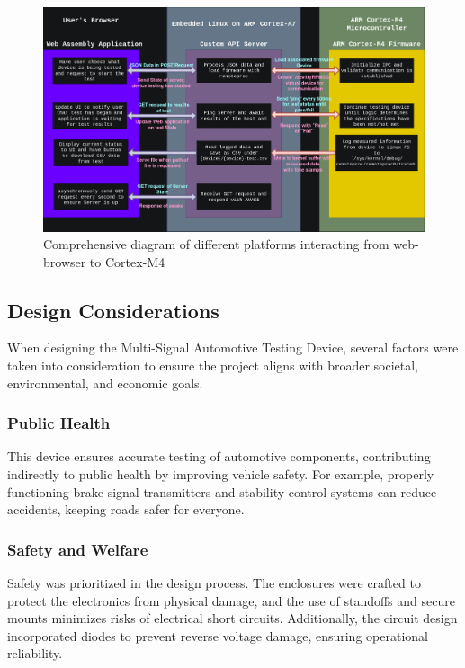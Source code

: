 \documentclass[12pt]{article}
\begin{document}
\begin{figure}[H]
  \includegraphics[width=\textwidth]{../assets/software_stack.drawio.png}
  \caption{Comprehensive diagram of different platforms interacting from web-browser to Cortex-M4}
\end{figure}

\subsection{Design Considerations}
When designing the Multi-Signal Automotive Testing Device, several factors were
taken into consideration to ensure the project aligns with broader societal,
environmental, and economic goals.

\subsubsection{Public Health}
This device ensures accurate testing of automotive components, contributing
indirectly to public health by improving vehicle safety. For example, properly
functioning brake signal transmitters and stability control systems can reduce
accidents, keeping roads safer for everyone.


\subsubsection{Safety and Welfare}
Safety was prioritized in the design process. The enclosures were crafted to
protect the electronics from physical damage, and the use of standoffs and
secure mounts minimizes risks of electrical short circuits. Additionally, the
circuit design incorporated diodes to prevent reverse voltage damage, ensuring
operational reliability.
\end{document}
